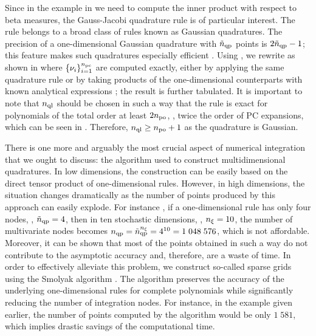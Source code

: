 Since in the example in  we need to compute the inner product with respect to beta measures, the Gauss-Jacobi quadrature rule is of particular interest.
The rule belongs to a broad class of rules known as Gaussian quadratures.
The precision of a one-dimensional Gaussian quadrature with ${\tilde{n}_\text{qp}}$ points is $2 {\tilde{n}_\text{qp}} - 1$; this feature makes such quadratures especially efficient \cite{heiss2008}.
Using , we rewrite  as shown in  where $\{ \nu_i \}_{i = 1}^{{n_\text{pc}}}$ are computed exactly, either by applying the same quadrature rule or by taking products of the one-dimensional counterparts with known analytical expressions \cite{xiu2010}; the result is further tabulated.
It is important to note that ${n_\text{ql}}$ should be chosen in such a way that the rule is exact for polynomials of the total order at least $2 {n_\text{po}}$, \ie, twice the order of PC expansions, which can be seen in  \cite{eldred2008}.
Therefore, ${n_\text{ql}} \geq {n_\text{po}} + 1$ as the quadrature is Gaussian.

There is one more and arguably the most crucial aspect of numerical integration that we ought to discuss: the algorithm used to construct multidimensional quadratures.
In low dimensions, the construction can be easily based on the direct tensor product of one-dimensional rules.
However, in high dimensions, the situation changes dramatically as the number of points produced by this approach can easily explode.
For instance \cite{heiss2008}, if a one-dimensional rule has only four nodes, \ie, ${\tilde{n}_\text{qp}} = 4$, then in ten stochastic dimensions, \ie, ${n_\xi} = 10$, the number of multivariate nodes becomes ${n_\text{qp}} = {\tilde{n}_\text{qp}}^{n_\xi} = 4^{10} = 1\;048\;576$, which is not affordable.
Moreover, it can be shown that most of the points obtained in such a way do not contribute to the asymptotic accuracy and, therefore, are a waste of time.
In order to effectively alleviate this problem, we construct so-called sparse grids using the Smolyak algorithm \cite{eldred2008, heiss2008, burkardt2013}.
The algorithm preserves the accuracy of the underlying one-dimensional rules for complete polynomials while significantly reducing the number of integration nodes.
For instance, in the example given earlier, the number of points computed by the algorithm would be only $1\;581$, which implies drastic savings of the computational time.

